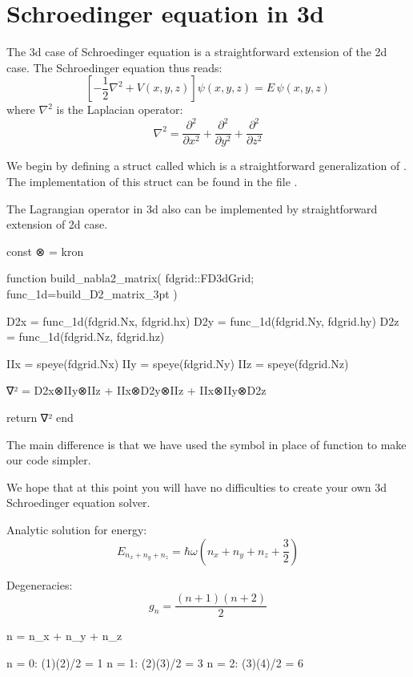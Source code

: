 \section{Schroedinger equation in 3d}

The 3d case of Schroedinger equation is a straightforward extension of the 2d case.
The Schroedinger equation thus reads:
\begin{equation}
\left[ -\frac{1}{2}\nabla^2 + V(x,y,z) \right] \psi(x,y,z) = E\,\psi(x,y,z)
\label{eq:sch_3d}
\end{equation}
%
where $\nabla^2$ is the Laplacian operator:
\begin{equation}
\nabla^2 = \frac{\partial^2}{\partial x^2} + \frac{\partial^2}{\partial y^2} + \frac{\partial^2}{\partial z^2}
\end{equation}

We begin by defining a struct called  which is a
straightforward generalization of . The implementation of this
struct can be found in the file .

The Lagrangian operator in 3d also can be implemented by straightforward extension
of 2d case.
\begin{juliacode}
const ⊗ = kron

function build_nabla2_matrix( fdgrid::FD3dGrid; func_1d=build_D2_matrix_3pt )

    D2x = func_1d(fdgrid.Nx, fdgrid.hx)
    D2y = func_1d(fdgrid.Ny, fdgrid.hy)
    D2z = func_1d(fdgrid.Nz, fdgrid.hz)

    IIx = speye(fdgrid.Nx)
    IIy = speye(fdgrid.Ny)
    IIz = speye(fdgrid.Nz)

    ∇² = D2x⊗IIy⊗IIz + IIx⊗D2y⊗IIz + IIx⊗IIy⊗D2z 

    return ∇²
end
\end{juliacode}

The main difference is that we have used the symbol  in place
of  function to make our code simpler.

We hope that at this point you will have no difficulties to create your own
3d Schroedinger equation solver.

Analytic solution for energy:
\begin{equation}
E_{n_{x} + n_{y} + n_{z}} = \hbar \omega \left( n_{x} + n_{y} + n_{z} + \frac{3}{2} \right)
\end{equation}

Degeneracies:
\begin{equation}
g_{n} = \frac{(n + 1)(n + 2)}{2}
\end{equation}

\begin{textcode}
n = n_x + n_y + n_z

n = 0: (1)(2)/2 = 1
n = 1: (2)(3)/2 = 3
n = 2: (3)(4)/2 = 6
\end{textcode}